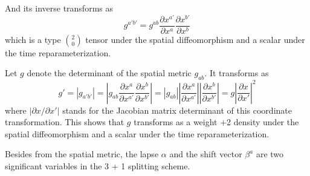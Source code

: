\documentclass[letterpaper,nofootinbib,prd,amsmath,onecolumn]{revtex4-1}
\begin{document}
 
And its inverse transforms as
\begin{equation}
g^{a'b'} = g^{ab}\frac{\partial x^{a'}}{\partial x^{a}}\frac{\partial x^{b'}}{\partial x^{b}}\label{spatial metric}
\end{equation}
which is a type $2 \choose 0$ tensor under the spatial diffeomorphism and a scalar under the time reparameterization. 


Let $g$ denote the determinant of the spatial metric $g_{ab}$. It transforms as
\begin{equation}
g' = |g_{a'b'}| = |g_{ab}\frac{\partial x^{a}}{\partial x^{a'}}\frac{\partial x^{b}}{\partial x^{b'}}| = |g_{ab}||\frac{\partial x^{a}}{\partial x^{a'}}||\frac{\partial x^{b}}{\partial x^{b'}}| = g|\frac{\partial x}{\partial x'}|^{2}
\end{equation}
where $|\partial x/\partial x'|$ stands for the Jacobian matrix determinant of this coordinate transformation. This shows that $g$ transforms as a weight +2 density under the spatial diffeomorphism and a scalar under the time reparameterization. 
 
Besides from the spatial metric, the lapse $\alpha$ and the shift vector $\beta^{a}$ are two significant variables in the 3 + 1 splitting scheme. 
\end{document}
